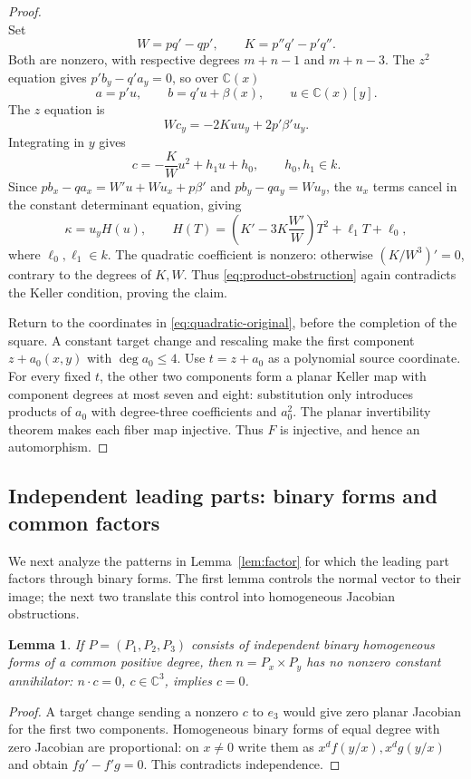 \documentclass[11pt,reqno]{amsart}
\numberwithin{equation}{section}
\theoremstyle{plain}
\newtheorem{lemma}[theorem]{Lemma}
\theoremstyle{definition}
\theoremstyle{remark}
\newcommand{\C}{\mathbb C}
\begin{document}
\begin{proof}
\[\]
Set
\[
W=pq'-qp',\qquad K=p''q'-p'q''.
\]
Both are nonzero, with respective degrees $m+n-1$ and $m+n-3$. The $z^2$ equation gives $p'b_y-q'a_y=0$, so over $\C(x)$
\[
a=p'u,\qquad b=q'u+\beta(x),\qquad u\in\C(x)[y].
\]
The $z$ equation is
\[
Wc_y=-2Kuu_y+2p'\beta'u_y.
\]
Integrating in $y$ gives
\[
c=-\frac KWu^2+h_1u+h_0,\qquad h_0,h_1\in k.
\]
Since $pb_x-qa_x=W'u+Wu_x+p\beta'$ and $pb_y-qa_y=Wu_y$, the $u_x$ terms cancel in the constant determinant equation, giving
\begin{equation}\label{eq:quadratic-wronskian}
\kappa=u_yH(u),\qquad
H(T)=\left(K'-3K\frac{W'}W\right)T^2+\ell_1T+\ell_0,
\end{equation}
where $\ell_0,\ell_1\in k$. The quadratic coefficient is nonzero: otherwise $(K/W^3)'=0$, contrary to the degrees of $K,W$.
Thus \eqref{eq:product-obstruction} again contradicts the Keller condition, proving the claim.

Return to the coordinates in \eqref{eq:quadratic-original}, before the
completion of the square. A constant target change and rescaling make the first component $z+a_0(x,y)$ with $\deg a_0\le4$. Use $t=z+a_0$ as a polynomial source coordinate. For every fixed $t$, the other two components form a planar Keller map with component degrees at most seven and eight: substitution only introduces products of $a_0$ with degree-three coefficients and $a_0^2$. The planar invertibility theorem makes each fiber map injective. Thus $F$ is injective, and hence an automorphism.
\end{proof}

\subsection{Independent leading parts: binary forms and common factors}\label{sec:leading-simple}
We next analyze the patterns in Lemma~\ref{lem:factor} for which the
leading part factors through binary forms. The first lemma controls the
normal vector to their image; the next two translate this control into
homogeneous Jacobian obstructions.
\begin{lemma}\label{lem:normal-annihilator}
If $P=(P_1,P_2,P_3)$ consists of independent binary homogeneous forms of a common positive degree, then $n=P_x\times P_y$ has no nonzero constant annihilator: $n\cdot c=0$, $c\in\C^3$, implies $c=0$.
\end{lemma}
\begin{proof}
A target change sending a nonzero $c$ to $e_3$ would give zero planar Jacobian for the first two components. Homogeneous binary forms of equal degree with zero Jacobian are proportional: on $x\ne0$ write them as $x^df(y/x),x^dg(y/x)$ and obtain $fg'-f'g=0$. This contradicts independence.
\end{proof}
\end{document}
